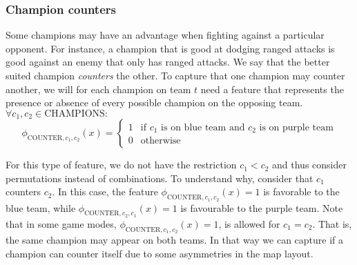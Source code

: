 \subsubsection{Champion counters}
Some champions may have an advantage when fighting against a particular opponent.
For instance, a champion that is good at dodging ranged attacks is good against an enemy that only has ranged attacks.
We say that the better suited champion \emph{counters} the other.
To capture that one champion may counter another, we will for each champion on team $t$ need a feature that represents the presence or absence of every possible champion on the opposing team. $\forall c_1, c_2 \in \text{CHAMPIONS}:$
\begin{equation}\label{eq:counter}
\phi_{\text{COUNTER},c_1,c_2}(x) = 
\begin{cases} 
1 & \text{if } c_1 \text{ is on blue team and } c_2 \text{ is on purple team} \\ 
0 & \text{otherwise} 
\end{cases}
\end{equation}

For this type of feature, we do not have the restriction $c_1 < c_2$ and thus consider permutations instead of combinations.
To understand why, consider that $c_1$ counters $c_2$.
In this case, the feature $\phi_{\text{COUNTER},c_1,c_2}(x) = 1$ is favorable to the blue team, while $\phi_{\text{COUNTER},c_2,c_1}(x) = 1$ is favourable to the purple team.
Note that in some game modes, $\phi_{\text{COUNTER},c_1,c_2}(x) = 1$, is allowed for $c_1 = c_2$. That is, the same champion may appear on both teams.
In that way we can capture if a champion can counter itself due to some asymmetries in the map layout.

